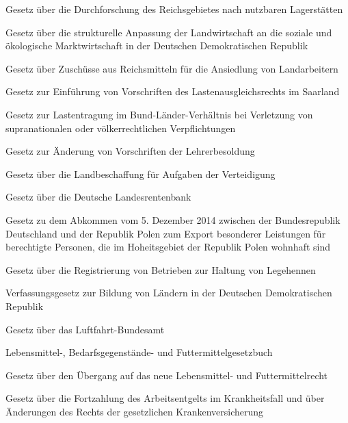 \item[{LagerstG}] Gesetz über die Durchforschung des Reichsgebietes nach nutzbaren Lagerstätten

\item[{LAnpG}] Gesetz über die strukturelle Anpassung der Landwirtschaft an die soziale und ökologische Marktwirtschaft in der Deutschen Demokratischen Republik

\item[{LArbAnsG}] Gesetz über Zuschüsse aus Reichsmitteln für die Ansiedlung von Landarbeitern

\item[{LASaarEG}] Gesetz zur Einführung von Vorschriften des Lastenausgleichsrechts im Saarland

\item[{LastG}] Gesetz zur Lastentragung im Bund-Länder-Verhältnis bei Verletzung von supranationalen oder völkerrechtlichen Verpflichtungen

\item[{LBesÄndG}] Gesetz zur Änderung von Vorschriften der Lehrerbesoldung

\item[{LBG}] Gesetz über die Landbeschaffung für Aufgaben der Verteidigung

\item[{LdRentBankG}] Gesetz über die Deutsche Landesrentenbank

\item[{LEBPAbkG-POL}] Gesetz zu dem Abkommen vom 5. Dezember 2014 zwischen der Bundesrepublik Deutschland und der Republik Polen zum Export besonderer Leistungen für berechtigte Personen, die im Hoheitsgebiet der Republik Polen wohnhaft sind

\item[{LegRegG}] Gesetz über die Registrierung von Betrieben zur Haltung von Legehennen

\item[{LEinfG}] Verfassungsgesetz zur Bildung von Ländern in der Deutschen Demokratischen Republik

\item[{LFBAG}] Gesetz über das Luftfahrt-Bundesamt

\item[{LFGB}] Lebensmittel-, Bedarfsgegenstände- und Futtermittelgesetzbuch

\item[{LFÜG}] Gesetz über den Übergang auf das neue Lebensmittel- und Futtermittelrecht

\item[{LFZ-KVRÄndG}] Gesetz über die Fortzahlung des Arbeitsentgelts im Krankheitsfall und über Änderungen des Rechts der gesetzlichen Krankenversicherung

